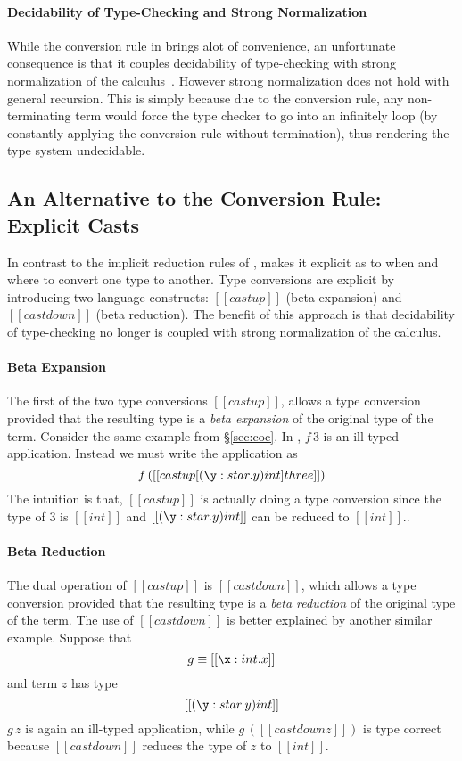 \paragraph{Decidability of Type-Checking and Strong Normalization} 
While the conversion rule in \coc brings alot of convenience, an unfortunate
consequence is that it couples decidability of type-checking with 
strong normalization of the calculus~\cite{coc:decidability}. 
However strong normalization does not
hold with general recursion. This is simply because due to the
conversion rule, any non-terminating term would force the type checker
to go into an infinitely loop (by constantly applying the conversion
rule without termination), thus rendering the type system undecidable.

\subsection{An Alternative to the Conversion Rule: Explicit Casts}

In contrast to the implicit reduction rules of \coc, \name makes it
explicit as to when and where to convert one type to another. Type
conversions are explicit by introducing two language constructs: $[[castup]]$
(beta expansion) and $[[castdown]]$ (beta reduction). The benefit of
this approach is that decidability of type-checking no longer is
coupled with strong normalization of the calculus.

\paragraph{Beta Expansion} The first of the two type conversions
$[[castup]]$, allows a type conversion provided that the resulting
type is a \emph{beta expansion} of the original type of the term.
Consider the same example
from \S\ref{sec:coc}. In \name, $f\,3$ is an ill-typed
application. Instead we must write the application as \[
f\,([[castup[(\y:star.y)int] three]]) \] The intuition is that,
$[[castup]]$ is actually doing a type conversion since the type of $ 3 $
is $ [[int]] $ and $ [[(\y:star.y)int]] $ can be reduced to $ [[int]]
$.. 

\paragraph{Beta Reduction}
The dual operation of $[[castup]]$ is $[[castdown]]$, which allows a
type conversion provided that the resulting type is a \emph{beta
  reduction} of the original type of the term. The use of
$[[castdown]]$ is better explained by another similar example. Suppose
that \[ g \equiv [[\x:int.x]] \] and term $z$ has type \[
[[(\y:star.y)int]] \] $ g\,z $ is again an ill-typed application,
while $ g\,([[castdown z]]) $ is type correct because $[[castdown]]$
reduces the type of $ z $ to $ [[int]] $. 

